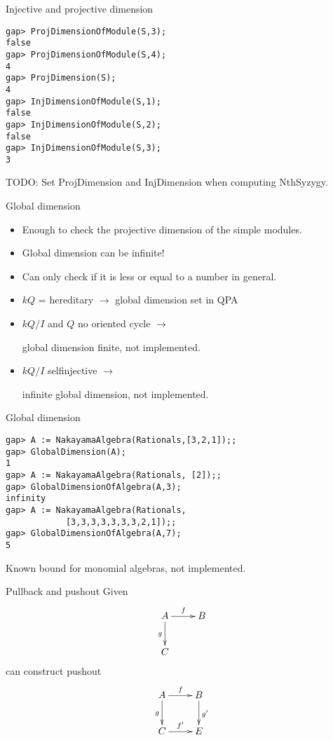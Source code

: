 \begin{frame}[fragile]{Injective and projective dimension}

\begin{verbatim}
gap> ProjDimensionOfModule(S,3);
false
gap> ProjDimensionOfModule(S,4);
4
gap> ProjDimension(S);
4
gap> InjDimensionOfModule(S,1); 
false
gap> InjDimensionOfModule(S,2);
false
gap> InjDimensionOfModule(S,3);
3
\end{verbatim}
TODO: Set ProjDimension and InjDimension when computing NthSyzygy. 
\end{frame}

\begin{frame}[fragile]{Global dimension}
\begin{itemize}
\item Enough to check the projective dimension of the simple modules.
\item Global dimension can be infinite!
\item Can only check if it is less or equal to a number in general.
\item $kQ$ = hereditary $\longrightarrow$ global dimension set in QPA
\item $kQ/I$ and $Q$ no oriented cycle $\longrightarrow$ \parbox[t]{4cm}{global dimension finite, not
implemented.}
\item $kQ/I$ selfinjective $\longrightarrow$ \parbox[t]{6cm}{infinite global dimension, not implemented.}
\end{itemize}
\end{frame}

\begin{frame}[fragile]{Global dimension}
\begin{verbatim}
gap> A := NakayamaAlgebra(Rationals,[3,2,1]);;
gap> GlobalDimension(A);
1
gap> A := NakayamaAlgebra(Rationals, [2]);;
gap> GlobalDimensionOfAlgebra(A,3);
infinity
gap> A := NakayamaAlgebra(Rationals,
            [3,3,3,3,3,3,3,2,1]);;
gap> GlobalDimensionOfAlgebra(A,7);
5
\end{verbatim}
Known bound for monomial algebras, not implemented. 
\end{frame}

\begin{frame}[fragile]{Pullback and pushout}
Given
\[\vcenter{\xymatrix{A\ar[r]^f\ar[d]_g & B\\ C & }}\]
can construct pushout
\[\xymatrix{A\ar[r]^f\ar[d]_g & B\ar[d]^{g'}\\ C\ar[r]^{f'} & E}\]
\end{frame}

